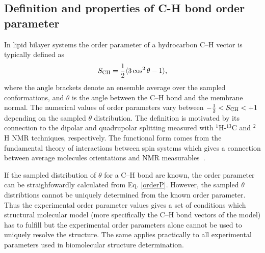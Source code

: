 \documentclass[aps,prl,superscriptaddress,twocolumn]{revtex4}
\begin{document}


\subsection{Definition and properties of C-H bond order parameter}\label{OPdefinition}
In lipid bilayer systems the order parameter of a hydrocarbon C--H vector is typically defined as 
\begin{equation}\label{orderP}
S_{{\rm CH}}=\frac{1}{2}\langle 3 \cos^2 \theta-1 \rangle,
\end{equation} 
where the angle brackets denote an ensemble average over the sampled conformations, and $\theta$ is the 
angle between the C--H bond and the membrane normal.
The numerical values of order parameters vary between $-\frac{1}{2} < S_{{\rm CH}} < +1$
depending on the sampled $\theta$ distribution.
The definition is motivated by its connection to the dipolar and quadrupolar splitting measured with
$^1$H-$^{13}$C and $^2$H NMR techniques, respectively. The functional form comes from 
the fundamental theory of interactions between spin systems which gives a connection between 
average molecules orientations and NMR measurables~\cite{abragam}. 

If the sampled distribution of $\theta$ for a C--H bond are known, the order parameter
can be straighfowardly calculated from Eq. \ref{orderP}. However, the sampled $\theta$ 
distribtions cannot be uniquely determined from the known order parameter. Thus the experimental
order parameter values gives a set of conditions which structural molecular model 
(more specifically the C--H bond vectors of the model) has to fulfill
but the experimental order parameters alone cannot be used to uniquely 
resolve the structure. The same applies practically to all
experimental parameters used in biomolecular structure determination. 
\end{document}
